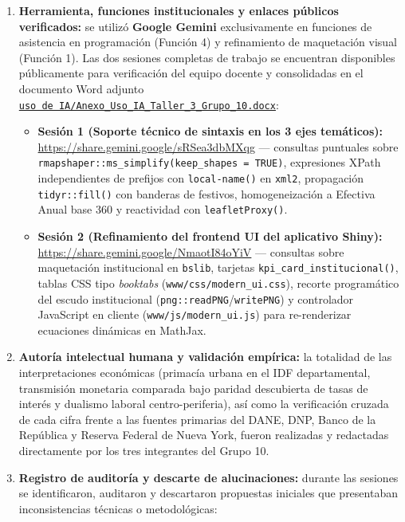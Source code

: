 \documentclass[
  10pt,
  letterpaper,
  DIV=11,
  numbers=noendperiod]{scrartcl}
\providecommand{\tightlist}{%
  \setlength{\itemsep}{0pt}\setlength{\parskip}{0pt}}
\begin{document}
\begin{enumerate}
\def\labelenumi{\arabic{enumi}.}
\tightlist
\item
  \textbf{Herramienta, funciones institucionales y enlaces públicos
  verificados:} se utilizó \textbf{Google Gemini} exclusivamente en
  funciones de asistencia en programación (Función 4) y refinamiento de
  maquetación visual (Función 1). Las dos sesiones completas de trabajo
  se encuentran disponibles públicamente para verificación del equipo
  docente y consolidadas en el documento Word adjunto
  \href{../uso\%20de\%20IA/Anexo_Uso_IA_Taller_3_Grupo_10.docx}{\texttt{uso\ de\ IA/Anexo\_Uso\_IA\_Taller\_3\_Grupo\_10.docx}}:

  \begin{itemize}
  \tightlist
  \item
    \textbf{Sesión 1 (Soporte técnico de sintaxis en los 3 ejes
    temáticos):} \url{https://share.gemini.google/sRSea3dbMXqg} ---
    consultas puntuales sobre
    \texttt{rmapshaper::ms\_simplify(keep\_shapes\ =\ TRUE)},
    expresiones XPath independientes de prefijos con
    \texttt{local-name()} en \texttt{xml2}, propagación
    \texttt{tidyr::fill()} con banderas de festivos, homogeneización a
    Efectiva Anual base 360 y reactividad con \texttt{leafletProxy()}.
  \item
    \textbf{Sesión 2 (Refinamiento del frontend UI del aplicativo
    Shiny):} \url{https://share.gemini.google/NmaotI84oYiV} ---
    consultas sobre maquetación institucional en \texttt{bslib},
    tarjetas \texttt{kpi\_card\_institucional()}, tablas CSS tipo
    \emph{booktabs} (\texttt{www/css/modern\_ui.css}), recorte
    programático del escudo institucional
    (\texttt{png::readPNG}/\texttt{writePNG}) y controlador JavaScript
    en cliente (\texttt{www/js/modern\_ui.js}) para re-renderizar
    ecuaciones dinámicas en MathJax.
  \end{itemize}
\item
  \textbf{Autoría intelectual humana y validación empírica:} la
  totalidad de las interpretaciones económicas (primacía urbana en el
  IDF departamental, transmisión monetaria comparada bajo paridad
  descubierta de tasas de interés y dualismo laboral centro-periferia),
  así como la verificación cruzada de cada cifra frente a las fuentes
  primarias del DANE, DNP, Banco de la República y Reserva Federal de
  Nueva York, fueron realizadas y redactadas directamente por los tres
  integrantes del Grupo 10.
\item
  \textbf{Registro de auditoría y descarte de alucinaciones:} durante
  las sesiones se identificaron, auditaron y descartaron propuestas
  iniciales que presentaban inconsistencias técnicas o metodológicas:


\end{enumerate}
\end{document}
